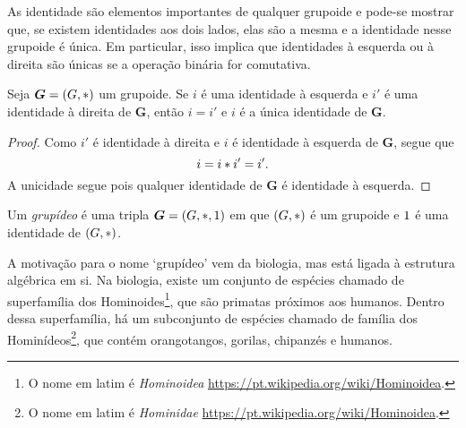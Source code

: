 As identidade são elementos importantes de qualquer grupoide e pode-se mostrar que, se existem identidades aos dois lados, elas são a mesma e a identidade nesse grupoide é única. Em particular, isso implica que identidades à esquerda ou à direita são únicas se a operação binária for comutativa.

\begin{comment}
\begin{proposition}
\label{prop:unicidade.identidade.grupoide}
Seja $\bm G = (G,\opb)$ um grupoide. Se $\id$ é uma identidade à esquerda e $\id'$ é uma identidade à direita de $\bm G$, então $\id = \id'$ e $\id$ é a única identidade de $\bm G$.
\end{proposition}
\begin{proof}
Como $\id'$ é identidade à direita e $\id$ é identidade à esquerda de $\bm G$, segue que
	\begin{equation*}
	\id = \id \opb \id' = \id'.
	\end{equation*}
A unicidade segue pois qualquer identidade de $\bm G$ é identidade à esquerda.
\end{proof}
\end{comment}

\begin{proposition}
\label{prop:unicidade.identidade.grupoide}
Seja $\bm G = (G,\ast)$ um grupoide. Se $i$ é uma identidade à esquerda e $i'$ é uma identidade à direita de $\bm G$, então $i = i'$ e $i$ é a única identidade de $\bm G$.
\end{proposition}
\begin{proof}
Como $i'$ é identidade à direita e $i$ é identidade à esquerda de $\bm G$, segue que
	\begin{equation*}
	i = i \ast i' = i'.
	\end{equation*}
A unicidade segue pois qualquer identidade de $\bm G$ é identidade à esquerda.
\end{proof}

\begin{definition}
Um \emph{grupídeo} é uma tripla $\bm G = (G,\ast,1)$ em que $(G,\ast)$ é um grupoide e $1$ é uma identidade de $(G,\ast)$.
\end{definition}

A motivação para o nome `grupídeo' vem da biologia, mas está ligada à estrutura algébrica em si. Na biologia, existe um conjunto de espécies chamado de superfamília dos Hominoides\footnote{O nome em latim é \textit{Hominoidea} \url{https://pt.wikipedia.org/wiki/Hominoidea}.}, que são primatas próximos aos humanos. Dentro dessa superfamília, há um subconjunto de espécies chamado de família dos Hominídeos\footnote{O nome em latim é \textit{Hominidae} \url{https://pt.wikipedia.org/wiki/Hominoidea}.}, que contém orangotangos, gorilas, chipanzés e humanos.

